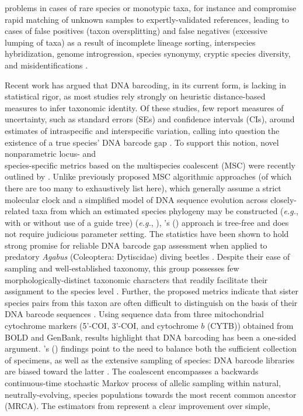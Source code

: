 \documentclass[12pt]{article}
\begin{document}
problems in cases of rare species or monotypic taxa, for instance \citep{ahrens2016rarity} and compromise rapid matching of unknown samples to expertly-validated references, leading to cases of false positives (taxon oversplitting) and false negatives (excessive lumping of taxa) as a result of incomplete lineage sorting, interspecies hybridization, genome introgression, species synonymy, cryptic species diversity, and misidentifications \citep{hubert2015dna, phillips2022lack}.

Recent work has argued that DNA barcoding, in its current form, is lacking in statistical rigor, as most studies rely strongly on heuristic distance-based measures to infer taxonomic identity. Of these studies, few report measures of uncertainty, such as standard errors (SEs) and confidence intervals (CIs), around estimates of intraspecific and interspecific  variation, calling into question the existence of a true species' DNA barcode gap \citep{candek2015dna, phillips2022lack}. To support this notion, novel nonparametric locus- and \\ species-specific metrics based on the multispecies coalescent (MSC) were recently outlined by \citet{phillips2024measure}. Unlike previously proposed MSC algorithmic approaches (of which there are too many to exhaustively list here), which generally assume a strict molecular clock and a simplified model of DNA sequence evolution across closely-related taxa from which an estimated species phylogeny may be constructed (\textit{e.g.}, with or without use of a guide tree) (\textit{e.g.}, \citet{rannala2003bayes, rannala2017efficient, yang2010bayesian, yang2014unguided, yang2017bayesian}), \citeauthor{phillips2024measure}'s (\citeyear{phillips2024measure}) approach is tree-free and does not require judicious parameter setting. The statistics have been shown to hold strong promise for reliable DNA barcode gap assessment when applied to predatory \textit{Agabus}  (Coleoptera: Dytiscidae) diving beetles \citep{phillips2024measure}. Despite their ease of sampling and well-established taxonomy, this group possesses few morphologically-distinct taxonomic characters that readily facilitate their assignment to the species level \citep{bergsten2012effect}. Further, the proposed metrics indicate that sister species pairs from this taxon are often difficult to distinguish on the basis of their DNA barcode sequences \citep{phillips2024measure}. Using sequence data from three mitochondrial cytochrome markers (5'-COI, 3'-COI, and cytochrome $b$ (CYTB)) obtained from BOLD and GenBank, results highlight that DNA barcoding has been a one-sided argument. \citeauthor{phillips2024measure}'s (\citeyear{phillips2024measure}) findings point to the need to balance both the sufficient collection of specimens, as well as the extensive sampling of species: DNA barcode libraries are biased toward the latter \citep{phillips2022lack}. The coalescent \citep{kingman1982coalescent, kingman1982genealogy} encompasses a backwards continuous-time stochastic Markov process of allelic sampling within natural, neutrally-evolving, species populations towards the most recent common ancestor (MRCA). The estimators from \citet{phillips2024measure} represent a clear improvement over simple, 
\end{document}
